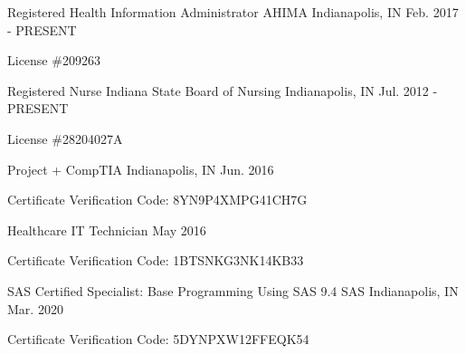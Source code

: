 

\begin{cventries}

  \cventry
    {Registered Health Information Administrator} %
    {AHIMA} %
    {Indianapolis, IN} %
    {Feb. 2017 - PRESENT} %
    {
      \begin{cvitems} %
        \item {License \#209263}
      \end{cvitems}
    }

  \cventry
    {Registered Nurse} %
    {Indiana State Board of Nursing} %
    {Indianapolis, IN} %
    {Jul. 2012 - PRESENT} %
    {
      \begin{cvitems} %
        \item {License \#28204027A}
      \end{cvitems}
    }

  \cventry
    {Project +} %
    {CompTIA} %
    {Indianapolis, IN} %
    {Jun. 2016} %
    {
      \begin{cvitems} %
        \item {Certificate Verification Code: 8YN9P4XMPG41CH7G}
      \end{cvitems}
    }
  \cventry
    {Healthcare IT Technician} %
    {} %
    {} %
    {May 2016} %
    {
      \begin{cvitems} %
        \item {Certificate Verification Code: 1BTSNKG3NK14KB33}
      \end{cvitems}
    }

  \cventry
    {SAS Certified Specialist: Base Programming Using SAS 9.4} %
    {SAS} %
    {Indianapolis, IN} %
    {Mar. 2020} %
    {
      \begin{cvitems} %
        \item {Certificate Verification Code: 5DYNPXW12FFEQK54}
      \end{cvitems}
    }


\end{cventries}
